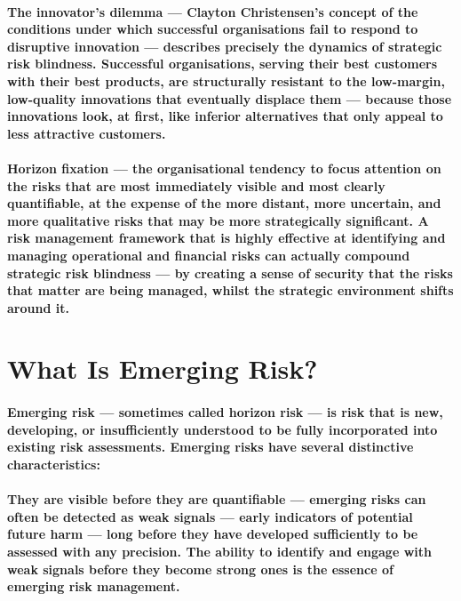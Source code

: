 \paragraph{\textbf{The innovator's dilemma} — Clayton Christensen's concept of the conditions under which successful organisations fail to respond to disruptive innovation — describes precisely the dynamics of strategic risk blindness. Successful organisations, serving their best customers with their best products, are structurally resistant to the low-margin, low-quality innovations that eventually displace them — because those innovations look, at first, like inferior alternatives that only appeal to less attractive customers.}
\paragraph{\textbf{Horizon fixation} — the organisational tendency to focus attention on the risks that are most immediately visible and most clearly quantifiable, at the expense of the more distant, more uncertain, and more qualitative risks that may be more strategically significant. A risk management framework that is highly effective at identifying and managing operational and financial risks can actually compound strategic risk blindness — by creating a sense of security that the risks that matter are being managed, whilst the strategic environment shifts around it.}

\section{What Is Emerging Risk?}
\paragraph{Emerging risk — sometimes called horizon risk — is risk that is new, developing, or insufficiently understood to be fully incorporated into existing risk assessments. Emerging risks have several distinctive characteristics:}
\paragraph{\textbf{They are visible before they are quantifiable} — emerging risks can often be detected as weak signals — early indicators of potential future harm — long before they have developed sufficiently to be assessed with any precision. The ability to identify and engage with weak signals before they become strong ones is the essence of emerging risk management.}
